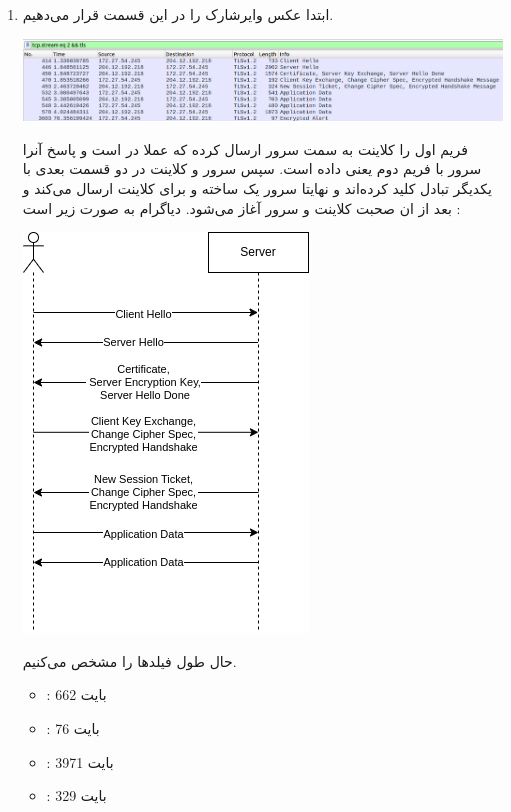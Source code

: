\begin{enumerate}[label=\alph*)]
    \item 
    ابتدا عکس وایرشارک را در این قسمت قرار می‌دهیم.
    \begin{center}
        \includegraphics[scale=0.38]{pics/wireshark1.png}
    \end{center}
    فریم اول را کلاینت به سمت سرور ارسال کرده که عملا 
    در 
    است و پاسخ آنرا سرور با فریم دوم یعنی 
    داده است.
    سپس سرور و کلاینت در دو قسمت بعدی با یکدیگر تبادل کلید کرده‌اند و نهایتا 
    سرور یک 
    ساخته و برای کلاینت ارسال می‌کند و بعد از ان صحبت کلاینت و سرور آغاز می‌شود.
    دیاگرام به صورت زیر است : 
    \begin{center}
        \includegraphics[scale=0.45]{pics/client.png}
    \end{center}
    حال طول فیلد‌ها را مشخص می‌کنیم.
    \begin{itemize}
        \item {} : 662 بایت
        \item {} : 76 بایت 
        \item {} : 3971 بایت
        \item  {} : 329 بایت

\end{itemize}
\end{enumerate}
